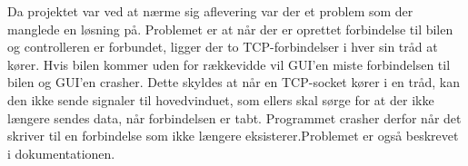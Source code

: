 Da projektet var ved at nærme sig aflevering var der et problem som der manglede en løsning på. Problemet er at når der er oprettet forbindelse til bilen og controlleren er forbundet, ligger der to TCP-forbindelser i hver sin tråd at kører. Hvis bilen kommer uden for rækkevidde vil GUI’en miste forbindelsen til bilen og GUI’en crasher. Dette skyldes at når en TCP-socket kører i en tråd, kan den ikke sende signaler til hovedvinduet, som ellers skal sørge for at der ikke længere sendes data, når forbindelsen er tabt. Programmet crasher derfor når det skriver til en forbindelse som ikke længere eksisterer.Problemet er også beskrevet i dokumentationen.